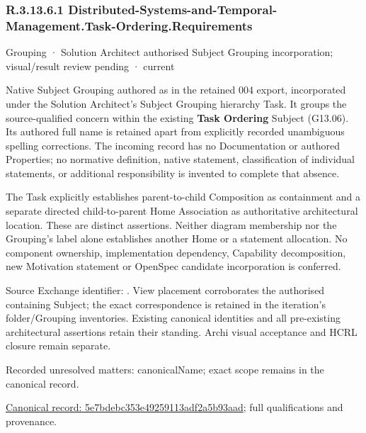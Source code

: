 \subsubsection*{R.3.13.6.1 Distributed-Systems-and-Temporal-Management.Task-Ordering.Requirements}
\label{navigation:R.3.13.6.1}

\label{element:5e7bdebc353e49259113adf2a5b93aad}
{\small Grouping · Solution Architect authorised Subject Grouping incorporation; visual/result review pending · current}\par

Native Subject Grouping authored as \texttt{} in the retained 004 export,
incorporated under the Solution Architect's Subject Grouping hierarchy Task.
It groups the source-qualified \texttt{} concern within
the existing \textbf{Task Ordering} Subject (G13.06). Its authored full name
is retained apart from explicitly recorded unambiguous spelling corrections.
The incoming record has no Documentation or authored Properties; no normative
definition, native statement, classification of individual statements, or
additional responsibility is invented to complete that absence.



The Task explicitly establishes parent-to-child Composition as containment and
a separate directed child-to-parent Home Association as authoritative architectural
location. These are distinct assertions. Neither diagram membership nor the
Grouping's label alone establishes another Home or a statement allocation.
No component ownership, implementation dependency, Capability decomposition,
new Motivation statement or OpenSpec candidate incorporation is conferred.



Source Exchange identifier: \texttt{}. View placement corroborates
the authorised containing Subject; the exact correspondence is retained in the
iteration's folder/Grouping inventories. Existing canonical identities and all
pre-existing architectural assertions retain their standing. Archi visual
acceptance and HCRL closure remain separate.


{\small Recorded unresolved matters: canonicalName; exact scope remains in the canonical record.}\par
{\footnotesize \href{../../../../continuum/grouping/5e7bdebc353e49259113adf2a5b93aad.md}{Canonical record: 5e7bdebc353e49259113adf2a5b93aad}; full qualifications and provenance.}\par
